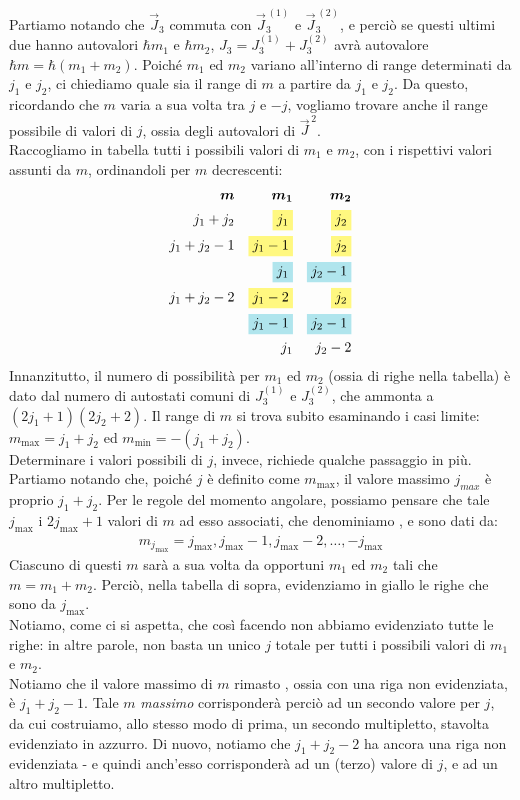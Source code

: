 \documentclass[../../FisicaTeorica.tex]{subfiles}
\begin{document}
Partiamo notando che $\vec{J}_3$ commuta con $\vec{J}^{\,(1)}_3$ e $\vec{J}^{\,(2)}_3$, e perciò se questi ultimi due hanno autovalori $\hbar m_1$ e $\hbar m_2$, $J_3 = J_3^{(1)} + J_3^{(2)}$ avrà autovalore $\hbar m = \hbar(m_1+m_2)$. Poiché $m_1$ ed $m_2$ variano all'interno di range determinati da $j_1$ e $j_2$, ci chiediamo quale sia il range di $m$ a partire da $j_1$ e $j_2$. Da questo, ricordando che $m$ varia a sua volta tra $j$ e $-j$, vogliamo trovare anche il range possibile di valori di $j$, ossia degli autovalori di $\vec{J}^{\,2}$.\\

Raccogliamo in tabella tutti i possibili valori di $m_1$ e $m_2$, con i rispettivi valori assunti da $m$, ordinandoli per $m$ decrescenti:
\begin{align*}
\bm{m} && \bm{m_1} && \bm{m_2}\\
j_1 + j_2 && \hlc{Yellow}{j_1} && \hlc{Yellow}{j_2}\\
j_1 + j_2-1 && \hlc{Yellow}{j_1-1} && \hlc{Yellow}{j_2}\\
 && \hlc{SkyBlue}{j_1} && \hlc{SkyBlue}{j_2-1}\\
 j_1+j_2-2 && \hlc{Yellow}{j_1 -2} && \hlc{Yellow}{j_2} \\
  && \hlc{SkyBlue}{j_1-1} && \hlc{SkyBlue}{j_2 -1}\\
  && j_1 && j_2 -2
\end{align*}
Innanzitutto, il numero di possibilità per $m_1$ ed $m_2$ (ossia di righe nella tabella) è dato dal numero di autostati comuni di $J_3^{(1)}$ e $J_3^{(2)}$, che ammonta a \hbox{$(2j_1 +1)(2j_2 +2)$}. Il range di $m$ si trova subito esaminando i casi limite: \hbox{$m_{\max}=j_1+j_2$} ed \hbox{$m_{\min}=-(j_1+j_2)$}.\\
Determinare i valori possibili di $j$, invece, richiede qualche passaggio in più. Partiamo notando che, poiché $j$ è definito come $m_{\max}$, il valore massimo $j_{max}$ è proprio $j_1+j_2$. Per le regole del momento angolare, possiamo pensare che tale $j_{\max}$  i $2j_{\max}+1$ valori di $m$ ad esso associati, che denominiamo , e sono dati da:
\begin{align*}
m_{j_{\max}}= j_{\max}, j_{\max}-1, j_{\max} -2, \dots, -j_{\max}
\end{align*}
Ciascuno di questi $m$ sarà a sua volta  da opportuni $m_1$ ed $m_2$ tali che $m=m_1+m_2$. Perciò, nella tabella di sopra, evidenziamo in giallo le righe che sono  da $j_{\max}$.\\
Notiamo, come ci si aspetta, che così facendo non abbiamo evidenziato tutte le righe: in altre parole, non basta un unico $j$ totale per  tutti i possibili valori di $m_1$ e $m_2$.\\
Notiamo che il valore massimo di $m$ rimasto , ossia con una riga non evidenziata, è $j_1+j_2-1$. Tale $m$ \textit{massimo} corrisponderà perciò ad un secondo valore per $j$, da cui costruiamo, allo stesso modo di prima, un secondo multipletto, stavolta evidenziato in azzurro. Di nuovo, notiamo che $j_1 + j_2 -2$ ha ancora una riga non evidenziata - e quindi anch'esso corrisponderà ad un (terzo) valore di $j$, e ad un altro multipletto.\\
\end{document}
